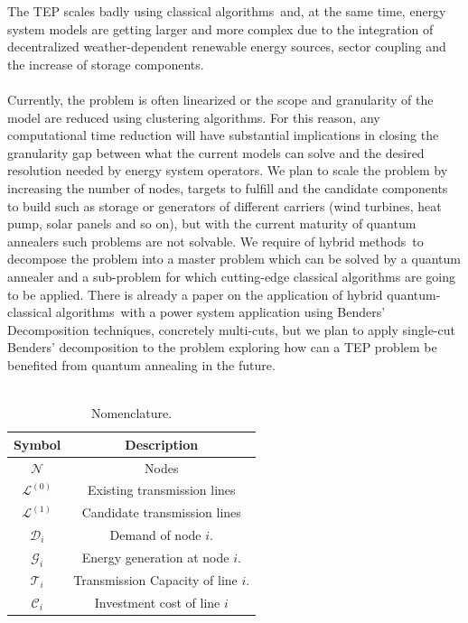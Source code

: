 The TEP scales badly using classical algorithms\,\cite{Oertel2014ComplexityEvaluation} and, at the same time, energy system models are getting larger and more complex due to the integration of decentralized weather-dependent renewable energy sources, sector coupling and the increase of storage components.\\\\
Currently, the problem is often linearized or the scope and granularity of the model are reduced using clustering algorithms. For this reason, any computational time reduction will have substantial implications in closing the granularity gap between what the current models can solve and the desired resolution needed by energy system operators. We plan to scale the problem by increasing the number of nodes, targets to fulfill and the candidate components to build such as storage or generators of different carriers (wind turbines, heat pump, solar panels and so on), but with the current maturity of quantum annealers such problems are not solvable. We require of hybrid methods\,\cite{Zhao2021HybridProgrammingb} to decompose the problem into a master problem which can be solved by a quantum annealer and a sub-problem for which cutting-edge classical algorithms are going to be applied. There is already a paper on the application of hybrid quantum-classical algorithms\,\cite{Paterakis2021HybridApplication} with a power system application using Benders' Decomposition techniques, concretely multi-cuts, but we plan to apply single-cut Benders' decomposition to the problem exploring how can a TEP problem be benefited from quantum annealing in the future.\\\\
\begin{table}
\centering
\begin{tabular}{cc} \\\toprule 
 \textbf{Symbol} & \textbf{Description} \\\midrule
 $\mathcal{N}$ & Nodes  \\\midrule
 $\mathcal{L}^{(0)}$ & Existing transmission lines  \\\midrule
 $\mathcal{L}^{(1)}$ & Candidate transmission lines \\\midrule
 $\mathcal{D}_{i}$ & Demand of node $i$. \\\midrule
 $\mathcal{G}_{i}$ & Energy generation at node $i$. \\\midrule
 $\mathcal{T}_{i}$ & Transmission Capacity of line $i$. \\\midrule
 $\mathcal{C}_{i}$ & Investment cost of line $i$ \\\bottomrule 
\end{tabular}
\caption{Nomenclature.}
\label{table:TEPNomenclature}
\end{table}
